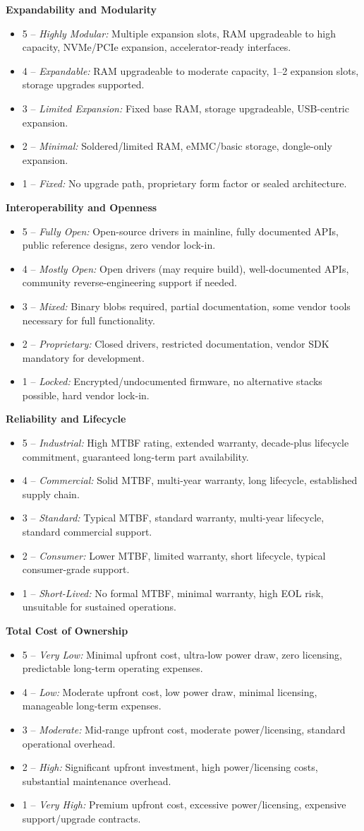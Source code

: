 \documentclass[11pt,a4paper]{article}
\newcommand{\criteriaheading}[1]{\par\smallskip\noindent\textbf{#1}\par}
\newcommand{\scoreitem}[3]{\item #1 -- \textit{#2:} #3}
\begin{document}
\criteriaheading{Expandability and Modularity}
\begin{itemize}
  \scoreitem{5}{Highly Modular}{Multiple expansion slots, RAM upgradeable to high capacity, NVMe/PCIe expansion, accelerator-ready interfaces.}
  \scoreitem{4}{Expandable}{RAM upgradeable to moderate capacity, 1--2 expansion slots, storage upgrades supported.}
  \scoreitem{3}{Limited Expansion}{Fixed base RAM, storage upgradeable, USB-centric expansion.}
  \scoreitem{2}{Minimal}{Soldered/limited RAM, eMMC/basic storage, dongle-only expansion.}
  \scoreitem{1}{Fixed}{No upgrade path, proprietary form factor or sealed architecture.}
\end{itemize}

\criteriaheading{Interoperability and Openness}
\begin{itemize}
  \scoreitem{5}{Fully Open}{Open-source drivers in mainline, fully documented APIs, public reference designs, zero vendor lock-in.}
  \scoreitem{4}{Mostly Open}{Open drivers (may require build), well-documented APIs, community reverse-engineering support if needed.}
  \scoreitem{3}{Mixed}{Binary blobs required, partial documentation, some vendor tools necessary for full functionality.}
  \scoreitem{2}{Proprietary}{Closed drivers, restricted documentation, vendor SDK mandatory for development.}
  \scoreitem{1}{Locked}{Encrypted/undocumented firmware, no alternative stacks possible, hard vendor lock-in.}
\end{itemize}

\criteriaheading{Reliability and Lifecycle}
\begin{itemize}
  \scoreitem{5}{Industrial}{High MTBF rating, extended warranty, decade-plus lifecycle commitment, guaranteed long-term part availability.}
  \scoreitem{4}{Commercial}{Solid MTBF, multi-year warranty, long lifecycle, established supply chain.}
  \scoreitem{3}{Standard}{Typical MTBF, standard warranty, multi-year lifecycle, standard commercial support.}
  \scoreitem{2}{Consumer}{Lower MTBF, limited warranty, short lifecycle, typical consumer-grade support.}
  \scoreitem{1}{Short-Lived}{No formal MTBF, minimal warranty, high EOL risk, unsuitable for sustained operations.}
\end{itemize}

\criteriaheading{Total Cost of Ownership}
\begin{itemize}
  \scoreitem{5}{Very Low}{Minimal upfront cost, ultra-low power draw, zero licensing, predictable long-term operating expenses.}
  \scoreitem{4}{Low}{Moderate upfront cost, low power draw, minimal licensing, manageable long-term expenses.}
  \scoreitem{3}{Moderate}{Mid-range upfront cost, moderate power/licensing, standard operational overhead.}
  \scoreitem{2}{High}{Significant upfront investment, high power/licensing costs, substantial maintenance overhead.}
  \scoreitem{1}{Very High}{Premium upfront cost, excessive power/licensing, expensive support/upgrade contracts.}
\end{itemize}
\end{document}
